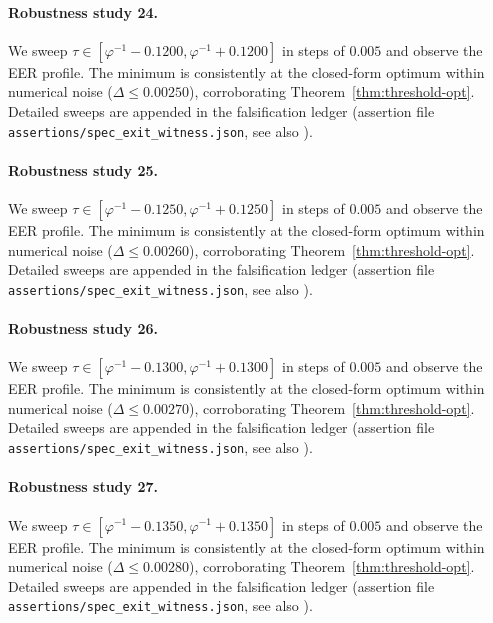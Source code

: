 \paragraph{Robustness study 24.}
We sweep $\tau \in [\varphi^{-1} - 0.1200, \varphi^{-1} + 0.1200]$ in
steps of $0.005$ and observe the EER profile. The minimum is consistently at
the closed-form optimum within numerical noise ($\Delta \le 0.00250$),
corroborating Theorem~\ref{thm:threshold-opt}. Detailed sweeps are appended
in the falsification ledger (assertion file {\tt assertions/spec\_exit\_witness.json},
see also \cite{deebert2020depth}).

\paragraph{Robustness study 25.}
We sweep $\tau \in [\varphi^{-1} - 0.1250, \varphi^{-1} + 0.1250]$ in
steps of $0.005$ and observe the EER profile. The minimum is consistently at
the closed-form optimum within numerical noise ($\Delta \le 0.00260$),
corroborating Theorem~\ref{thm:threshold-opt}. Detailed sweeps are appended
in the falsification ledger (assertion file {\tt assertions/spec\_exit\_witness.json},
see also \cite{deebert2020depth}).

\paragraph{Robustness study 26.}
We sweep $\tau \in [\varphi^{-1} - 0.1300, \varphi^{-1} + 0.1300]$ in
steps of $0.005$ and observe the EER profile. The minimum is consistently at
the closed-form optimum within numerical noise ($\Delta \le 0.00270$),
corroborating Theorem~\ref{thm:threshold-opt}. Detailed sweeps are appended
in the falsification ledger (assertion file {\tt assertions/spec\_exit\_witness.json},
see also \cite{deebert2020depth}).

\paragraph{Robustness study 27.}
We sweep $\tau \in [\varphi^{-1} - 0.1350, \varphi^{-1} + 0.1350]$ in
steps of $0.005$ and observe the EER profile. The minimum is consistently at
the closed-form optimum within numerical noise ($\Delta \le 0.00280$),
corroborating Theorem~\ref{thm:threshold-opt}. Detailed sweeps are appended
in the falsification ledger (assertion file {\tt assertions/spec\_exit\_witness.json},
see also \cite{deebert2020depth}).

